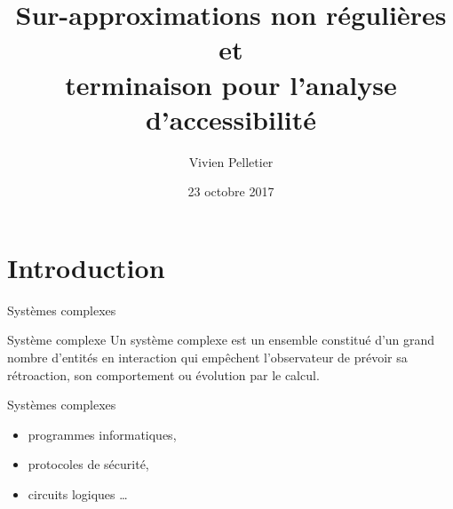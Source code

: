 \documentclass[xcolor={dvipsnames}]{beamer}
\author{
  Vivien Pelletier
}
\title[Soutenance de thèse]{Sur-approximations non régulières et\\ terminaison pour l'analyse d'accessibilité}
\date{23 octobre 2017}
\institute
{
  \footnotesize{Encadré par :}\\
  Pierre Réty et Yohan Boichut
}
\begin{document}
\maketitle

\section{Introduction}

\begin{frame}{Systèmes complexes}
  \begin{block}{Système complexe}
    Un système complexe est un ensemble constitué d'un grand nombre d'entités en interaction qui empêchent l'observateur de prévoir sa rétroaction, son comportement ou évolution par le calcul.
  \end{block}
  \pause
  \begin{exampleblock}{Systèmes complexes}
    \begin{itemize}
    \item programmes informatiques,
    \item protocoles de sécurité,
    \item circuits logiques \ldots
    \end{itemize}
  \end{exampleblock}
\end{frame}
\end{document}

